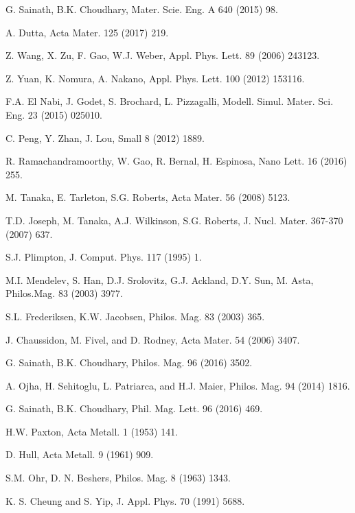 \documentclass[%
reprint,%
 amssymb, amsmath,%
 aip,apl,%
]{revtex4-1}
\begin{document}
\begin{thebibliography}{99}
 G. Sainath, B.K. Choudhary, Mater. Scie. Eng. A 640 (2015) 98.

 A. Dutta, Acta Mater. 125 (2017) 219.




 Z. Wang, X. Zu, F. Gao, W.J. Weber, Appl. Phys. Lett. 89 (2006) 243123.

 Z. Yuan, K. Nomura, A. Nakano, Appl. Phys. Lett. 100 (2012) 153116.

 F.A. El Nabi, J. Godet, S. Brochard, L. Pizzagalli, Modell. Simul. Mater. Sci. Eng. 23 (2015) 025010. 

 C. Peng, Y. Zhan, J. Lou, Small 8 (2012) 1889.

 R. Ramachandramoorthy, W. Gao, R. Bernal, H. Espinosa, Nano Lett. 16 (2016) 255.

 M. Tanaka, E. Tarleton, S.G. Roberts, Acta Mater. 56 (2008) 5123.

 T.D. Joseph, M. Tanaka, A.J. Wilkinson, S.G. Roberts, J. Nucl. Mater. 367-370 (2007) 637.




 S.J. Plimpton, J. Comput. Phys. 117 (1995) 1.

 M.I. Mendelev, S. Han, D.J. Srolovitz, G.J. Ackland, D.Y. Sun, M. Asta, Philos.Mag. 83 (2003) 3977.

 S.L. Frederiksen, K.W. Jacobsen, Philos. Mag. 83 (2003) 365.

 J. Chaussidon, M. Fivel, and D. Rodney, Acta Mater. 54 (2006) 3407.

 G. Sainath, B.K. Choudhary, Philos. Mag. 96 (2016) 3502.

  A. Ojha, H. Sehitoglu, L. Patriarca, and H.J. Maier, Philos. Mag. 94 (2014) 1816.

 G. Sainath, B.K. Choudhary, Phil. Mag. Lett. 96 (2016) 469.

 H.W. Paxton, Acta Metall. 1 (1953) 141.

 D. Hull, Acta Metall. 9 (1961) 909.

 S.M. Ohr, D. N. Beshers, Philos. Mag. 8 (1963) 1343.



 K. S. Cheung and S. Yip, J. Appl. Phys. 70 (1991) 5688.


\end{thebibliography}
\end{document}
